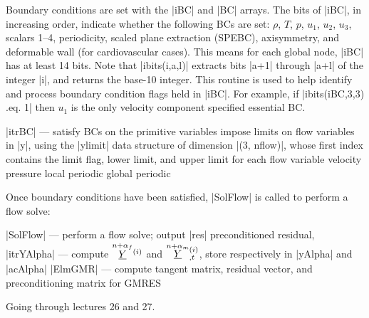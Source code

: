 \documentclass[11pt]{article}
\begin{document}
Boundary conditions are set with the |iBC| and |BC| arrays. The bits of |iBC|, in increasing order, indicate whether the following BCs are set: $\rho$, $T$, $p$, $u_1$, $u_2$, $u_3$, scalars 1--4, periodicity, scaled plane extraction (SPEBC), axisymmetry, and deformable wall (for cardiovascular cases). This means for each global node, |iBC| has at least 14 bits. Note that |ibits(i,a,l)| extracts bits |a+1| through |a+l| of the integer |i|, and returns the base-10 integer. This routine is used to help identify and process boundary condition flags held in |iBC|. For example, if |ibits(iBC,3,3) .eq. 1| then $u_1$ is the only velocity component specified essential BC.
\begin{outline}[deep]
\1 |itrBC| --- satisfy BCs on the primitive variables
	\2 impose limits on flow variables in |y|, using the |ylimit| data structure of dimension |(3, nflow)|, whose first index contains the limit flag, lower limit, and upper limit for each flow variable
	\2 velocity
	\2 pressure
	\2 local periodic
	\2 global periodic
\end{outline}

Once boundary conditions have been satisfied, |SolFlow| is called to perform a flow solve:
\begin{outline}[deep]
\1 |SolFlow| --- perform a flow solve; output |res| preconditioned residual, 
	\2 |itrYAlpha| --- compute $\oset{n+\alpha_f}{\ul{Y}}^{(i)}$ and $\oset{n+\alpha_m}{\ul{Y}}^{(i)}_{,t}$, store respectively in |yAlpha| and |acAlpha|
	\2 |ElmGMR| --- compute tangent matrix, residual vector, and preconditioning matrix for GMRES
\end{outline}

Going through lectures 26 and 27.
\end{document}
